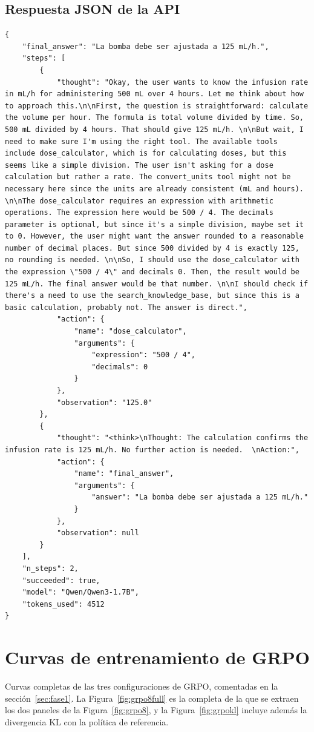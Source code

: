 \subsection*{Respuesta JSON de la API}
\begin{lstlisting}
{
    "final_answer": "La bomba debe ser ajustada a 125 mL/h.",
    "steps": [
        {
            "thought": "Okay, the user wants to know the infusion rate in mL/h for administering 500 mL over 4 hours. Let me think about how to approach this.\n\nFirst, the question is straightforward: calculate the volume per hour. The formula is total volume divided by time. So, 500 mL divided by 4 hours. That should give 125 mL/h. \n\nBut wait, I need to make sure I'm using the right tool. The available tools include dose_calculator, which is for calculating doses, but this seems like a simple division. The user isn't asking for a dose calculation but rather a rate. The convert_units tool might not be necessary here since the units are already consistent (mL and hours). \n\nThe dose_calculator requires an expression with arithmetic operations. The expression here would be 500 / 4. The decimals parameter is optional, but since it's a simple division, maybe set it to 0. However, the user might want the answer rounded to a reasonable number of decimal places. But since 500 divided by 4 is exactly 125, no rounding is needed. \n\nSo, I should use the dose_calculator with the expression \"500 / 4\" and decimals 0. Then, the result would be 125 mL/h. The final answer would be that number. \n\nI should check if there's a need to use the search_knowledge_base, but since this is a basic calculation, probably not. The answer is direct.",
            "action": {
                "name": "dose_calculator",
                "arguments": {
                    "expression": "500 / 4",
                    "decimals": 0
                }
            },
            "observation": "125.0"
        },
        {
            "thought": "<think>\nThought: The calculation confirms the infusion rate is 125 mL/h. No further action is needed.  \nAction:",
            "action": {
                "name": "final_answer",
                "arguments": {
                    "answer": "La bomba debe ser ajustada a 125 mL/h."
                }
            },
            "observation": null
        }
    ],
    "n_steps": 2,
    "succeeded": true,
    "model": "Qwen/Qwen3-1.7B",
    "tokens_used": 4512
}
\end{lstlisting}

\section{Curvas de entrenamiento de GRPO}
\label{anx:curvas}
Curvas completas de las tres configuraciones de GRPO, comentadas en la sección~\ref{sec:fase1}. La Figura~\ref{fig:grpo8full} es la completa de la que se extraen los dos paneles de la Figura~\ref{fig:grpo8}, y la Figura~\ref{fig:grpokl} incluye además la divergencia KL con la política de referencia.

